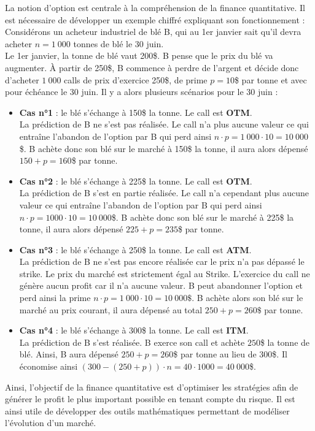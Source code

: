 \newpage
La notion d'option est centrale à la compréhension de la finance quantitative. Il est nécessaire de développer un exemple chiffré expliquant son fonctionnement :\vspace{0.025\textheight} \\
Considérons un acheteur industriel de blé B, qui au 1er janvier sait qu'il devra acheter $n = 1\:000$ tonnes de blé le 30 juin.\\
Le 1er janvier, la tonne de blé vaut 200\$. B pense que le prix du blé va augmenter. À partir de 250\$, B commence à perdre de l'argent et décide donc d'acheter $1\:000$ calls de prix d'exercice 250\$, de prime $p=10$\$ par tonne et avec pour échéance le 30 juin. Il y a alors plusieurs scénarios pour le 30 juin :
\begin{itemize}
    \item \textbf{Cas n°1} : le blé s'échange à 150\$ la tonne. Le call est \textbf{OTM}. \\ La prédiction de B ne s'est pas réalisée. Le call n'a plus aucune valeur ce qui entraîne l'abandon de l'option par B qui perd ainsi $n \cdot p = 1\:000 \cdot10 = 10\:000$\$. B achète donc son blé sur le marché à 150\$ la tonne, il aura alors dépensé $150+p=160$\$ par tonne. \\
    \item \textbf{Cas n°2} : le blé s'échange à 225\$ la tonne. Le call est \textbf{OTM}.\\ La prédiction de B s'est en partie réalisée. Le call n'a cependant plus aucune valeur ce qui entraîne l'abandon de l'option par B qui perd ainsi $n \cdot p = 1000 \cdot10 = 10\:000$\$. B achète donc son blé sur le marché à 225\$ la tonne, il aura alors dépensé $225+p=235$\$ par tonne. \\
    \item \textbf{Cas n°3} : le blé s'échange à 250\$ la tonne. Le call est \textbf{ATM}. \\ La prédiction de B ne s'est pas encore réalisée car le prix n’a pas dépassé le strike. Le prix du marché est strictement égal au Strike. L'exercice du call ne génère aucun profit car il n'a aucune valeur. B peut abandonner l'option et perd ainsi la prime $n \cdot p = 1\:000 \cdot 10 = 10\:000\$$. B achète alors son blé sur le marché au prix courant, il aura dépensé au total $250 + p = 260\$$ par tonne. \\
    \item \textbf{Cas n°4} : le blé s'échange à 300\$ la tonne. Le call est \textbf{ITM}.\\ La prédiction de B s'est réalisée. B exerce son call et achète $250$\$ la tonne de blé. Ainsi, B aura dépensé $250+p=260$\$ par tonne au lieu de $300$\$. Il économise ainsi $(300-(250+p))\cdot n = 40 \cdot 1000 = 40\:000$\$. \\
\end{itemize}
Ainsi, l'objectif de la finance quantitative est d'optimiser les stratégies afin de générer le profit le plus important possible en tenant compte du risque. Il est ainsi utile de développer des outils mathématiques permettant de modéliser l'évolution d'un marché.

